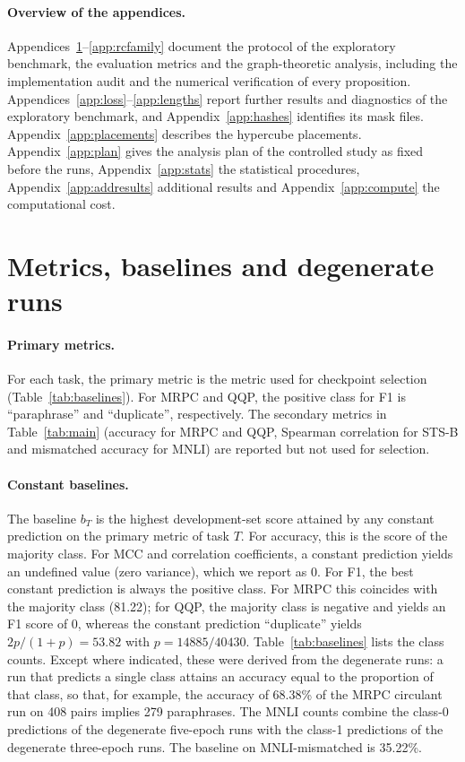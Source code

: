 \documentclass[10pt]{article}
\begin{document}
\paragraph{Overview of the appendices.} Appendices~\ref{app:metrics}--\ref{app:rcfamily} document the protocol of the exploratory benchmark, the evaluation metrics and the graph-theoretic analysis, including the implementation audit and the numerical verification of every proposition. Appendices~\ref{app:loss}--\ref{app:lengths} report further results and diagnostics of the exploratory benchmark, and Appendix~\ref{app:hashes} identifies its mask files. Appendix~\ref{app:placements} describes the hypercube placements. Appendix~\ref{app:plan} gives the analysis plan of the controlled study as fixed before the runs, Appendix~\ref{app:stats} the statistical procedures, Appendix~\ref{app:addresults} additional results and Appendix~\ref{app:compute} the computational cost.

\section{Metrics, baselines and degenerate runs}
\label{app:metrics}

\paragraph{Primary metrics.} For each task, the primary metric is the metric used for checkpoint selection (Table~\ref{tab:baselines}). For MRPC and QQP, the positive class for F1 is ``paraphrase'' and ``duplicate'', respectively. The secondary metrics in Table~\ref{tab:main} (accuracy for MRPC and QQP, Spearman correlation for STS-B and mismatched accuracy for MNLI) are reported but not used for selection.

\paragraph{Constant baselines.} The baseline $b_T$ is the highest development-set score attained by any constant prediction on the primary metric of task $T$. For accuracy, this is the score of the majority class. For MCC and correlation coefficients, a constant prediction yields an undefined value (zero variance), which we report as 0. For F1, the best constant prediction is always the positive class. For MRPC this coincides with the majority class (81.22); for QQP, the majority class is negative and yields an F1 score of 0, whereas the constant prediction ``duplicate'' yields $2p/(1+p)=53.82$ with $p=14885/40430$. Table~\ref{tab:baselines} lists the class counts. Except where indicated, these were derived from the degenerate runs: a run that predicts a single class attains an accuracy equal to the proportion of that class, so that, for example, the accuracy of 68.38\% of the MRPC circulant run on 408 pairs implies 279 paraphrases. The MNLI counts combine the class-0 predictions of the degenerate five-epoch runs with the class-1 predictions of the degenerate three-epoch runs. The baseline on MNLI-mismatched is 35.22\%.
\end{document}

